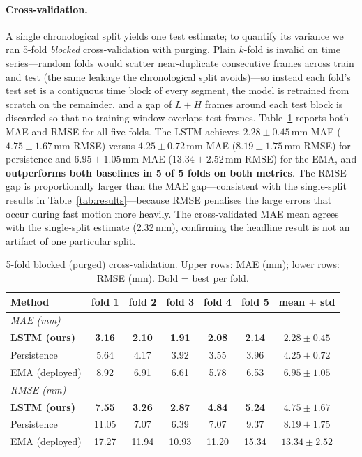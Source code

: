 \documentclass[11pt,a4paper]{article}
\begin{document}
\paragraph{Cross-validation.} A single chronological split yields one test
estimate; to quantify its variance we ran 5-fold \emph{blocked} cross-validation
with purging. Plain $k$-fold is invalid on time series---random folds would
scatter near-duplicate consecutive frames across train and test (the same
leakage the chronological split avoids)---so instead each fold's test set is a
contiguous time block of every segment, the model is retrained from scratch on
the remainder, and a gap of $L{+}H$ frames around each test block is discarded
so that no training window overlaps test frames. Table~\ref{tab:cv} reports both
MAE and RMSE for all five folds. The LSTM achieves $2.28 \pm 0.45$\,mm MAE
($4.75 \pm 1.67$\,mm RMSE) versus $4.25 \pm 0.72$\,mm MAE ($8.19 \pm 1.75$\,mm
RMSE) for persistence and $6.95 \pm 1.05$\,mm MAE ($13.34 \pm 2.52$\,mm RMSE)
for the EMA, and \textbf{outperforms both baselines in 5 of 5 folds on both
metrics}. The RMSE gap is proportionally larger than the MAE gap---consistent
with the single-split results in Table~\ref{tab:results}---because RMSE
penalises the large errors that occur during fast motion more heavily.
The cross-validated MAE mean agrees with the single-split estimate (2.32\,mm),
confirming the headline result is not an artifact of one particular split.

\begin{table}[t]
  \centering
  \caption{5-fold blocked (purged) cross-validation. Upper rows: MAE (mm);
           lower rows: RMSE (mm). Bold = best per fold.}
  \label{tab:cv}
  \begin{tabular}{lccccc|c}
    \toprule
    Method & fold 1 & fold 2 & fold 3 & fold 4 & fold 5 & mean $\pm$ std \\
    \midrule
    \multicolumn{7}{l}{\textit{MAE (mm)}} \\[2pt]
    \textbf{LSTM (ours)} & \textbf{3.16} & \textbf{2.10} & \textbf{1.91} & \textbf{2.08} & \textbf{2.14} & $\mathbf{2.28 \pm 0.45}$ \\
    Persistence          & 5.64 & 4.17 & 3.92 & 3.55 & 3.96 & $4.25 \pm 0.72$ \\
    EMA (deployed)       & 8.92 & 6.91 & 6.61 & 5.78 & 6.53 & $6.95 \pm 1.05$ \\
    \midrule
    \multicolumn{7}{l}{\textit{RMSE (mm)}} \\[2pt]
    \textbf{LSTM (ours)} & \textbf{7.55} & \textbf{3.26} & \textbf{2.87} & \textbf{4.84} & \textbf{5.24} & $\mathbf{4.75 \pm 1.67}$ \\
    Persistence          & 11.05 & 7.07 & 6.39 & 7.07 & 9.37 & $8.19 \pm 1.75$ \\
    EMA (deployed)       & 17.27 & 11.94 & 10.93 & 11.20 & 15.34 & $13.34 \pm 2.52$ \\
    \bottomrule
  \end{tabular}
\end{table}
\end{document}
